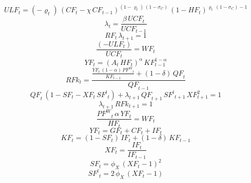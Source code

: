 \begin{dmath}
{ULF}_{t}=\left(-{{\varrho}}_{t}\right)\, \left({CF}_{t}-{{\chi}}\, {CF}_{t-1}\right)^{\left(1-{{\varrho}}_{t}\right)\, \left(1-{{\sigma_{C}}}\right)}\, \left(1-{HF}_{t}\right)^{{{\varrho}}_{t}\, \left(1-{{\sigma_{C}}}\right)-1}
\end{dmath}
\begin{dmath}
{\lambda}_{t}=\frac{{{\beta}}\, {UCF}_{t}}{{UCF}_{t-1}}
\end{dmath}
\begin{dmath}
{RF}_{t}\, {\lambda}_{t+1}=1
\end{dmath}
\begin{dmath}
\frac{\left(-{ULF}_{t}\right)}{{UCF}_{t}}={WF}_{t}
\end{dmath}
\begin{dmath}
{YF}_{t}=\left({A}_{t}\, {HF}_{t}\right)^{{{\alpha}}}\, {KF}_{t-1}^{1-{{\alpha}}}
\end{dmath}
\begin{dmath}
{RFk}_{t}=\frac{\frac{{YF}_{t}\, \left(1-{{\alpha}}\right)\, {PF^{W}}_{t}}{{KF}_{t-1}}+\left(1-{{\delta}}\right)\, {QF}_{t}}{{QF}_{t-1}}
\end{dmath}
\begin{dmath}
{QF}_{t}\, \left(1-{SF}_{t}-{XF}_{t}\, {SF^{l}}_{t}\right)+{\lambda}_{t+1}\, {QF}_{t+1}\, {SF^{l}}_{t+1}\, {XF}_{t+1}^{2}=1
\end{dmath}
\begin{dmath}
{\lambda}_{t+1}\, {RFk}_{t+1}=1
\end{dmath}
\begin{dmath}
\frac{{PF^{W}}_{t}\, {{\alpha}}\, {YF}_{t}}{{HF}_{t}}={WF}_{t}
\end{dmath}
\begin{dmath}
{YF}_{t}={GF}_{t}+{CF}_{t}+{IF}_{t}
\end{dmath}
\begin{dmath}
{KF}_{t}=\left(1-{SF}_{t}\right)\, {IF}_{t}+\left(1-{{\delta}}\right)\, {KF}_{t-1}
\end{dmath}
\begin{dmath}
{XF}_{t}=\frac{{IF}_{t}}{{IF}_{t-1}}
\end{dmath}
\begin{dmath}
{SF}_{t}={{\phi_{X}}}\, \left({XF}_{t}-1\right)^{2}
\end{dmath}
\begin{dmath}
{SF^{l}}_{t}=2\, {{\phi_{X}}}\, \left({XF}_{t}-1\right)
\end{dmath}
